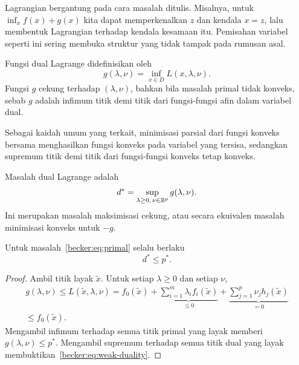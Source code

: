 Lagrangian bergantung pada cara masalah ditulis. Misalnya, untuk
$\inf_x f(x)+g(x)$ kita dapat memperkenalkan $z$ dan kendala $x=z$, lalu
membentuk Lagrangian terhadap kendala kesamaan itu. Pemisahan variabel seperti
ini sering membuka struktur yang tidak tampak pada rumusan asal.

\begin{defn}
  Fungsi dual Lagrange didefinisikan oleh
  \begin{equation}
    \label{becker:eq:dual-function}
    g(\lambda,\nu)=\inf_{x\in D} L(x,\lambda,\nu).
  \end{equation}
  Fungsi $g$ cekung terhadap $(\lambda,\nu)$, bahkan bila masalah primal
  tidak konveks, sebab $g$ adalah infimum titik demi titik dari fungsi-fungsi
  afin dalam variabel dual.
\end{defn}

Sebagai kaidah umum yang terkait, minimisasi parsial dari fungsi konveks
bersama menghasilkan fungsi konveks pada variabel yang tersisa, sedangkan
supremum titik demi titik dari fungsi-fungsi konveks tetap konveks.

\begin{defn}
  Masalah dual Lagrange adalah
  \begin{equation}
    \label{becker:eq:dual-problem}
    d^*=\sup_{\lambda\geq0,\,\nu\in\mathbb{R}^p} g(\lambda,\nu).
  \end{equation}
  Ini merupakan masalah maksimisasi cekung, atau secara ekuivalen masalah
  minimisasi konveks untuk $-g$.
\end{defn}

\begin{theorem}
  Untuk masalah~\eqref{becker:eq:primal} selalu berlaku
  \begin{equation}
    \label{becker:eq:weak-duality}
    d^*\leq p^*.
  \end{equation}
\end{theorem}
\begin{proof}
  Ambil titik layak $\tilde x$. Untuk setiap $\lambda\geq0$ dan setiap
  $\nu$,
  \begin{multline}
    g(\lambda,\nu)\leq L(\tilde x,\lambda,\nu)
    =f_0(\tilde x)
      +\underbrace{\sum_{i=1}^{m}\lambda_i f_i(\tilde x)}_{\leq0}
      +\underbrace{\sum_{j=1}^{p}\nu_j h_j(\tilde x)}_{=0}\\
    \leq f_0(\tilde x).
  \end{multline}
  Mengambil infimum terhadap semua titik primal yang layak memberi
  $g(\lambda,\nu)\leq p^*$. Mengambil supremum terhadap semua titik dual yang
  layak membuktikan~\eqref{becker:eq:weak-duality}.
\end{proof}

